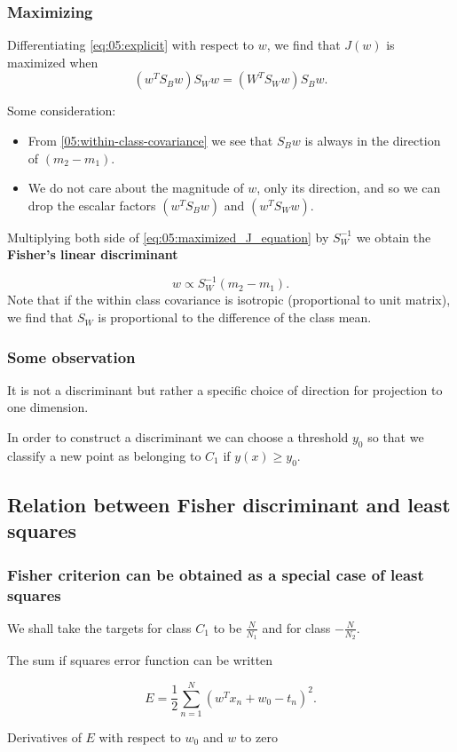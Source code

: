 \begin{frame}
    \frametitle{Maximizing}

    Differentiating \ref{eq:05:explicit} with respect to 
    $w$, we find that $J(w)$ is maximized when 
    \begin{equation}\label{eq:05:maximized_J_equation}
        (w^T S_B w)S_W w 
        = 
        (W^T S_W w) S_B w.
    \end{equation}

    Some consideration: 
    \begin{itemize}
        \item From \ref{05:within-class-covariance} we see that $S_B w$ is always in the direction of $(m_2 -m_1)$.
        \item We do not care about the magnitude of $w$, only its direction, and so we can drop the escalar factors $(w^T S_B w)$ and $(w^T S_W w)$. 
    \end{itemize}

    Multiplying both side of \ref{eq:05:maximized_J_equation} by $S^{-1}_W$ we obtain the \textbf{Fisher's linear discriminant}

    \begin{equation}
        w 
        \propto
        S^{-1}_W (m_2 - m_1).
    \end{equation}
    Note that if the within class covariance is isotropic  (proportional to unit matrix), we find that $S_W$ is proportional to the difference of the class mean. 
\end{frame}

\begin{frame}
    \frametitle{Some observation }

    It is not a discriminant but rather 
    a specific choice of direction 
    for projection to one dimension. 
    
    In order to construct a discriminant we can 
    choose a threshold $y_0$ so that we classify a new point as belonging to 
    $C_1$ if $y(x) \geq y_0$. 
\end{frame}

\subsection{Relation between Fisher discriminant and least squares}

\begin{frame}
    \frametitle{Fisher criterion can be obtained as a special case of least squares}

    We shall take the targets for class $C_1$ to be $\frac{N}{N_1}$
    and for class $-\frac{N}{N_2}$. 

    The sum if squares error function can be written 

    \begin{equation}
        E = \frac{1}{2}
        \sum_{n = 1}^N
        (w^T x_n + w_0 - t_n)^2.
    \end{equation}

    Derivatives of $E$ with respect to $w_0$ and $w$ to zero

\end{frame}

